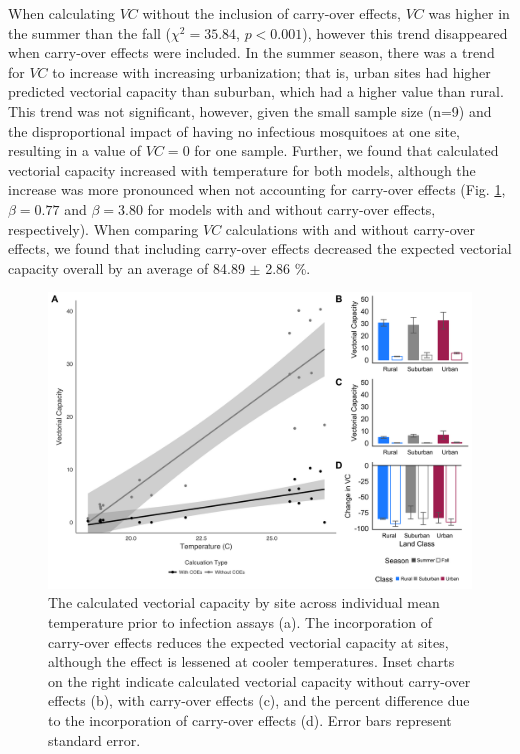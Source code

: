 \documentclass[12pt]{article}
\begin{document}
When calculating $VC$ without the inclusion of carry-over effects, $VC$ was  higher in the summer than the fall ($\chi^2=35.84$, $p<0.001$), however this trend disappeared when carry-over effects were included. In the summer season, there was a trend for $VC$ to increase with increasing urbanization; that is, urban sites had higher predicted vectorial capacity than suburban, which had a higher value than rural. This trend was not significant, however, given the small sample size (n=9) and the disproportional impact of having no infectious mosquitoes at one site, resulting in a value of $VC=0$ for one sample. Further, we found that calculated vectorial capacity increased with temperature for both models, although the increase was more pronounced when not accounting for carry-over effects (Fig. \ref{Fig:VC}, $\beta=0.77$ and $\beta=3.80$ for models with and without carry-over effects, respectively). When comparing $VC$ calculations with and without carry-over effects, we found that including carry-over effects decreased the expected vectorial capacity overall by an average of 84.89 $\pm$ 2.86 \%.

\begin{figure}
\centering\includegraphics[width=0.9\linewidth]{Figure5.png}
\caption{The calculated vectorial capacity by site across individual mean temperature prior to infection assays (a). The incorporation of carry-over effects reduces the expected vectorial capacity at sites, although the effect is lessened at cooler temperatures. Inset charts on the right indicate calculated vectorial capacity without carry-over effects (b), with carry-over effects (c), and the percent difference due to the incorporation of carry-over effects (d). Error bars represent standard error.
}
\label{Fig:VC}
\end{figure}
\end{document}
